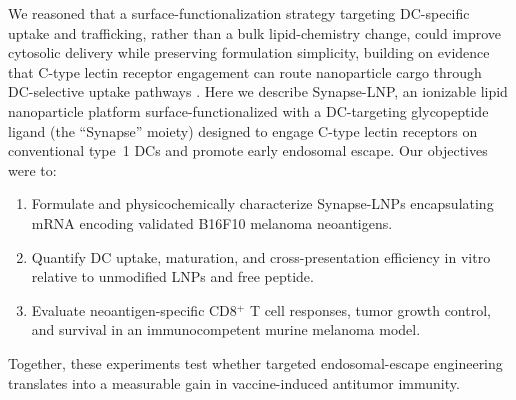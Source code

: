 We reasoned that a surface-functionalization strategy targeting DC-specific uptake and trafficking, rather than a bulk lipid-chemistry change, could improve cytosolic delivery while preserving formulation simplicity, building on evidence that C-type lectin receptor engagement can route nanoparticle cargo through DC-selective uptake pathways \citep{Falk2020}. Here we describe Synapse-LNP, an ionizable lipid nanoparticle platform surface-functionalized with a DC-targeting glycopeptide ligand (the ``Synapse'' moiety) designed to engage C-type lectin receptors on conventional type~1 DCs and promote early endosomal escape. Our objectives were to:
\begin{enumerate}[label=\sffamily\arabic*.]
\item Formulate and physicochemically characterize Synapse-LNPs encapsulating mRNA encoding validated B16F10 melanoma neoantigens.
\item Quantify DC uptake, maturation, and cross-presentation efficiency in vitro relative to unmodified LNPs and free peptide.
\item Evaluate neoantigen-specific CD8$^{+}$ T cell responses, tumor growth control, and survival in an immunocompetent murine melanoma model.
\end{enumerate}
Together, these experiments test whether targeted endosomal-escape engineering translates into a measurable gain in vaccine-induced antitumor immunity.
